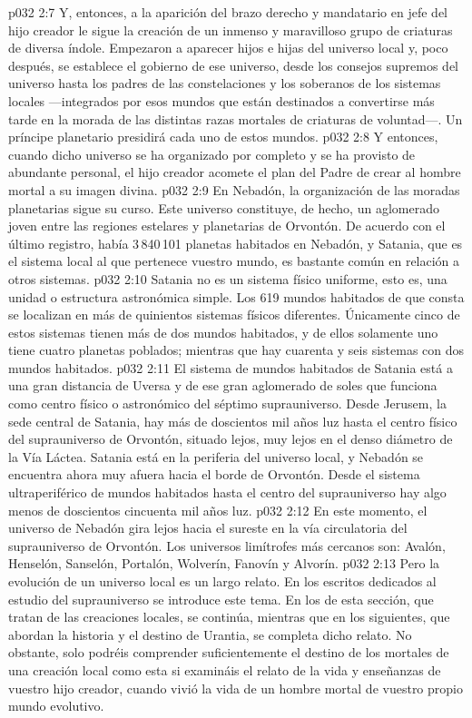 \vs p032 2:7 Y, entonces, a la aparición del brazo derecho y mandatario en jefe del hijo creador le sigue la creación de un inmenso y maravilloso grupo de criaturas de diversa índole. Empezaron a aparecer hijos e hijas del universo local y, poco después, se establece el gobierno de ese universo, desde los consejos supremos del universo hasta los padres de las constelaciones y los soberanos de los sistemas locales ---integrados por esos mundos que están destinados a convertirse más tarde en la morada de las distintas razas mortales de criaturas de voluntad---. Un príncipe planetario presidirá cada uno de estos mundos.
\vs p032 2:8 Y entonces, cuando dicho universo se ha organizado por completo y se ha provisto de abundante personal, el hijo creador acomete el plan del Padre de crear al hombre mortal a su imagen divina.
\vs p032 2:9 \pc En Nebadón, la organización de las moradas planetarias sigue su curso. Este universo constituye, de hecho, un aglomerado joven entre las regiones estelares y planetarias de Orvontón. De acuerdo con el último registro, había 3\,840\,101 planetas habitados en Nebadón, y Satania, que es el sistema local al que pertenece vuestro mundo, es bastante común en relación a otros sistemas.
\vs p032 2:10 Satania no es un sistema físico uniforme, esto es, una unidad o estructura astronómica simple. Los 619 mundos habitados de que consta se localizan en más de quinientos sistemas físicos diferentes. Únicamente cinco de estos sistemas tienen más de dos mundos habitados, y de ellos solamente uno tiene cuatro planetas poblados; mientras que hay cuarenta y seis sistemas con dos mundos habitados.
\vs p032 2:11 El sistema de mundos habitados de Satania está a una gran distancia de Uversa y de ese gran aglomerado de soles que funciona como centro físico o astronómico del séptimo suprauniverso. Desde Jerusem, la sede central de Satania, hay más de doscientos mil años luz hasta el centro físico del suprauniverso de Orvontón, situado lejos, muy lejos en el denso diámetro de la Vía Láctea. Satania está en la periferia del universo local, y Nebadón se encuentra ahora muy afuera hacia el borde de Orvontón. Desde el sistema ultraperiférico de mundos habitados hasta el centro del suprauniverso hay algo menos de doscientos cincuenta mil años luz.
\vs p032 2:12 En este momento, el universo de Nebadón gira lejos hacia el sureste en la vía circulatoria del suprauniverso de Orvontón. Los universos limítrofes más cercanos son: Avalón, Henselón, Sanselón, Portalón, Wolverín, Fanovín y Alvorín.
\vs p032 2:13 \pc Pero la evolución de un universo local es un largo relato. En los escritos dedicados al estudio del suprauniverso se introduce este tema. En los de esta sección, que tratan de las creaciones locales, se continúa, mientras que en los siguientes, que abordan la historia y el destino de Urantia, se completa dicho relato. No obstante, solo podréis comprender suficientemente el destino de los mortales de una creación local como esta si examináis el relato de la vida y enseñanzas de vuestro hijo creador, cuando vivió la vida de un hombre mortal de vuestro propio mundo evolutivo.
